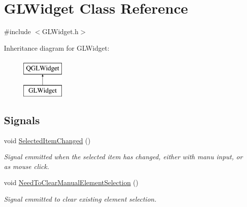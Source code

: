 \hypertarget{classGLWidget}{}\section{G\+L\+Widget Class Reference}
\label{classGLWidget}


{\ttfamily \#include $<$G\+L\+Widget.\+h$>$}

Inheritance diagram for G\+L\+Widget\+:\begin{figure}[H]
\begin{center}
\leavevmode
\includegraphics[height=2.000000cm]{classGLWidget}
\end{center}
\end{figure}
\subsection*{Signals}
\begin{DoxyCompactItemize}
\item 
\hypertarget{classGLWidget_a031d84e410b07e5c8afca4ab11e06c54}{}void \hyperlink{classGLWidget_a031d84e410b07e5c8afca4ab11e06c54}{Selected\+Item\+Changed} ()\label{classGLWidget_a031d84e410b07e5c8afca4ab11e06c54}

\begin{DoxyCompactList}\small\item\em Signal emmitted when the selected item has changed, either with manu input, or as mouse click. \end{DoxyCompactList}\item 
\hypertarget{classGLWidget_a628dd262f28dda97912e2f5d61eb8c6a}{}void \hyperlink{classGLWidget_a628dd262f28dda97912e2f5d61eb8c6a}{Need\+To\+Clear\+Manual\+Element\+Selection} ()\label{classGLWidget_a628dd262f28dda97912e2f5d61eb8c6a}

\begin{DoxyCompactList}\small\item\em Signal emmitted to clear existing element selection. \end{DoxyCompactList}\end{DoxyCompactItemize}

